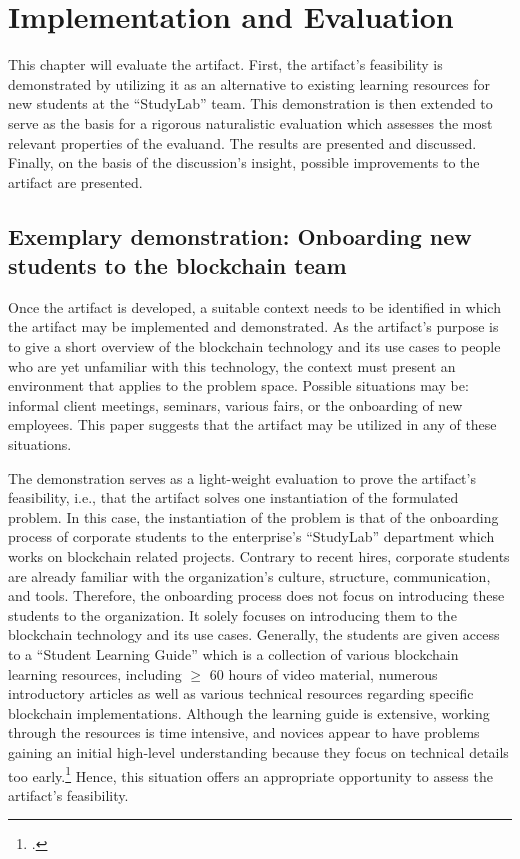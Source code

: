 \chapter{Implementation and Evaluation} \label{chap:Evaluation}

This chapter will evaluate the artifact. First, the artifact's feasibility is demonstrated by utilizing it as an alternative to existing learning resources for new students at the \enquote{StudyLab} team. This demonstration is then extended to serve as the basis for a rigorous naturalistic evaluation which assesses the most relevant properties of the evaluand. The results are presented and discussed. Finally, on the basis of the discussion's insight, possible improvements to the artifact are presented.

\section{Exemplary demonstration: Onboarding new students to the blockchain team} \label{sec:demo}

Once the artifact is developed, a suitable context needs to be identified in which the artifact may be implemented and demonstrated. As the artifact's purpose is to give a short overview of the blockchain technology and its use cases to people who are yet unfamiliar with this technology, the context must present an environment that applies to the problem space. Possible situations may be: informal client meetings, seminars, various fairs, or the onboarding of new employees. This paper suggests that the artifact may be utilized in any of these situations.

The demonstration serves as a light-weight evaluation to prove the artifact's feasibility, i.e., that the artifact solves one instantiation of the formulated problem. In this case, the instantiation of the problem is that of the onboarding process of corporate students to the enterprise's \enquote{StudyLab} department which works on blockchain related projects. Contrary to recent hires, corporate students are already familiar with the organization's culture, structure, communication, and tools. Therefore, the onboarding process does not focus on introducing these students to the organization. It solely focuses on introducing them to the blockchain technology and its use cases. Generally, the students are given access to a \enquote{Student Learning Guide} which is a collection of various blockchain learning resources, including $\geq$ 60 hours of video material, numerous introductory articles as well as various technical resources regarding specific blockchain implementations. Although the learning guide is extensive, working through the resources is time intensive, and novices appear to have problems gaining an initial high-level understanding because they focus on technical details too early.\footcites[Cf.][]{RalphB_Interview} Hence, this situation offers an appropriate opportunity to assess the artifact's feasibility.

